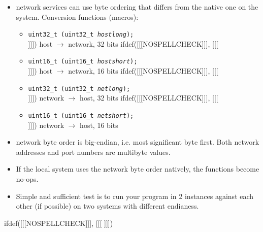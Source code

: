 \begin{slide}
\begin{itemize}
\item network services can use byte ordering that differs from the native
one on the system. Conversion functions (macros):
    \begin{itemize}
    ifdef([[[NOSPELLCHECK]]], [[[
    \item\texttt{uint32\_t (uint32\_t \emph{hostlong});}\\
    ]]]) host $\rightarrow$ network, 32 bits
    ifdef([[[NOSPELLCHECK]]], [[[
    \item\texttt{uint16\_t (uint16\_t \emph{hostshort});}\\
    ]]]) host $\rightarrow$ network, 16 bits
    ifdef([[[NOSPELLCHECK]]], [[[
    \item \texttt{uint32\_t (uint32\_t \emph{netlong});}\\
    ]]]) network $\rightarrow$ host, 32 bits
    ifdef([[[NOSPELLCHECK]]], [[[
    \item \texttt{uint16\_t (uint16\_t \emph{netshort});}\\
    ]]]) network $\rightarrow$ host, 16 bits 
    \end{itemize}
\item network byte order is big-endian, i.e. most significant byte first.
Both network addresses and port numbers are multibyte values.
\end{itemize}
\end{slide}

\label{HTON}

\begin{itemize}
\item If the local system uses the network byte order natively, the functions
become no-ops.
\item Simple and sufficient test is to run your program in 2 instances 
against each other (if possible) on two systems with different endianess.
\end{itemize}


ifdef([[[NOSPELLCHECK]]], [[[
]]])


